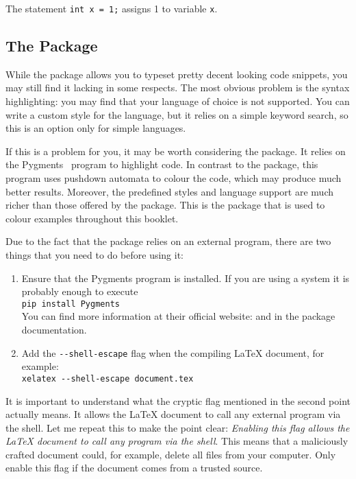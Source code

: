 \begin{example}[examplewidth=0.55\linewidth]
\lstset{
  language=C,
  numbers=left,
  xleftmargin=1.2em, %
  breaklines,
  basicstyle=\ttfamily,
  prebreak=\textrightarrow,
}



The statement
\lstinline|int x = 1;|
assigns 1 to variable
\lstinline|x|.
\end{example}

\subsection{The  Package}

While the  package allows you to typeset pretty decent looking
code snippets, you may still find it lacking in some respects. The most obvious
problem is the syntax highlighting: you may find that your language of choice
is not supported. You can write a custom style for the language, but it relies
on a simple keyword search, so this is an option only for simple languages.

If this is a problem for you, it may be worth considering the 
package. It relies on the Pygments~\cite{pygments} program to highlight code.
In contrast to the  package, this program uses pushdown automata
to colour the code, which may produce much better results. Moreover, the
predefined styles and language support are much richer than those offered by
the  package. This is the package that is used to colour examples
throughout this booklet.

Due to the fact that the  package relies on an external program,
there are two things that you need to do before using it:
\begin{enumerate}
  \item Ensure that the Pygments program is installed. If you are using a
        \Unix{} system it is probably enough to execute\\
        \verb|pip install Pygments|\\
        You can find more information at their official website:
         and in the  package documentation.

  \item
        Add the \verb|--shell-escape| flag when the compiling \LaTeX{} document,
        for example:\\
        \verb|xelatex --shell-escape document.tex|
\end{enumerate}
It is important to understand what the cryptic flag mentioned in the second
point actually means. It allows the \LaTeX{} document to call any external
program via the shell. Let me repeat this to make the point clear:
\emph{Enabling this flag allows the \LaTeX{} document to call any program via
the shell}. This means that a maliciously crafted document could, for example,
delete all files from your computer. Only enable this flag if the document comes
from a trusted source.


